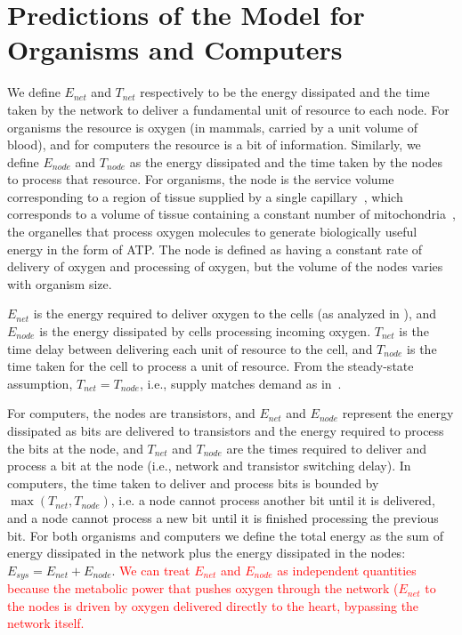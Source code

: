 \documentclass[12pt]{article}
\newcommand{\red}[1]{\textcolor{red}{#1}}
\begin{document}
\section{Predictions of the Model for Organisms and Computers}

We define $E_{net}$ and $T_{net}$ respectively to be the energy dissipated and
the time taken by the network to deliver a fundamental unit of resource to each node.  For
organisms the resource is oxygen (in mammals, carried by a unit volume of
blood), and for computers the resource is a bit of information.
Similarly, we define $E_{node}$ and $T_{node}$ as the energy dissipated and the
time taken by the nodes to process that resource.  For organisms, the node is
the service volume corresponding to a region of tissue supplied by a single
capillary~\cite{banavar10}, which corresponds to a volume of tissue containing a constant number
of mitochondria~\cite{west2002allometric}, the organelles that process oxygen molecules to generate
biologically useful energy in the form of ATP.  The node is defined as having a constant
rate of delivery of oxygen and processing of oxygen, but the
volume of the nodes varies with organism size. 

$E_{net}$ is the energy required to deliver oxygen to the cells (as analyzed in
\cite{west97}), and $E_{node}$ is the energy dissipated by cells processing
incoming oxygen. $T_{net}$ is the time delay between delivering
each unit of resource to the cell, and $T_{node}$ is the time taken
for the cell to process a unit of resource. From the steady-state assumption, $T_{net} = T_{node}$,
i.e., supply matches demand as in~\cite{banavar10}.

For computers, the nodes are transistors, and 
$E_{net}$ and $E_{node}$ represent the energy dissipated as bits are delivered
to transistors and the energy required to process the bits at the node, and
$T_{net}$ and $T_{node}$ are the times required to deliver and process a bit at
the node (i.e., network and transistor switching delay).  In computers, the time
taken to deliver and process bits is bounded by $\max(T_{net},T_{node})$, i.e. a node cannot process another
bit until it is delivered, and a node cannot process a new bit until it is finished
processing the previous bit.   For
both organisms and computers we define the total energy as the sum of energy
dissipated in the network plus the energy dissipated in the nodes: $E_{sys} =
E_{net} + E_{node}$.  \red{We can treat $E_{net}$ and $E_{node}$ as independent quantities because
the metabolic power that pushes oxygen through the network ($E_{net}$ to the nodes is driven by oxygen delivered directly to the heart, bypassing the network itself.}
\end{document}
